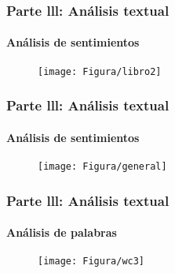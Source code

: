 \documentclass[11pt]{beamer}
\begin{document}
\begin{frame}
\frametitle{Parte lll: Análisis textual}
\framesubtitle{Análisis de sentimientos}
\begin{figure}
{\texttt{[image: Figura/libro2]}} 	\\
	\end{figure}
\end{frame}


\begin{frame}
\frametitle{Parte lll: Análisis textual}
\framesubtitle{Análisis de sentimientos}
\begin{figure}
{\texttt{[image: Figura/general]}} 	\\
	\end{figure}
\end{frame}

\begin{frame}
\frametitle{Parte lll: Análisis textual}
\framesubtitle{Análisis de palabras}
\begin{figure}
{\texttt{[image: Figura/wc3]}} 	\\
	\end{figure}
\end{frame}
\end{document}
